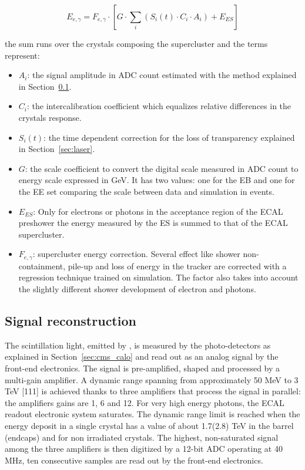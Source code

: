 \begin{equation}
  E_{e,\gamma} = F_{e,\gamma} \cdot \left[ G \cdot \sum_{i} ( S_i(t)\cdot C_i \cdot A_i ) + E_{ES} \right]
\end{equation}
\label{eq:sc_energy}

the sum runs over the crystals composing the supercluster and the terms represent:

\begin{itemize}
\item $A_i$: the signal amplitude in ADC count estimated with the method explained in Section~\ref{sec:signal_reco}.
\item $C_i$: the intercalibration coefficient which equalizes relative differences in the crystals response.
\item $S_i(t)$: the time dependent correction for the loss of transparency explained in Section~\ref{sec:laser}.
\item $G$: the scale coefficient to convert the digital scale measured in ADC count to energy scale expressed in GeV.
  It has two values:
  one for the EB and one for the EE set comparing the scale between data and simulation in \Zee events.
\item $E_{ES}$: Only for electrons or photons in the acceptance region of the ECAL preshower the energy measured
  by the ES is summed to that of the ECAL supercluster.
\item $F_{e,\gamma}$: supercluster energy correction. Several effect like shower non-containment, pile-up and
  loss of energy in the tracker are corrected with a regression technique trained on simulation. The factor also
  takes into account the slightly different shower development of electron and photons.
\end{itemize}

\subsection{Signal reconstruction}
\label{sec:signal_reco}
The scintillation light, emitted by \PbWO , is measured by the photo-detectors as explained in
Section~\ref{sec:cms_calo} and read
out as an analog signal by the front-end electronics. The signal is pre-amplified, shaped
and processed by a multi-gain amplifier. A dynamic range spanning from
approximately 50 MeV to 3 TeV [111] is achieved thanks to three
amplifiers that process the signal in parallel: the amplifiers gains are 1, 6 and 12.
For very high energy photons, the ECAL readout electronic system saturates.
The dynamic range limit is reached when the energy
deposit in a single crystal has a value of about 1.7(2.8) TeV in the barrel (endcaps) and for
non irradiated crystals. The highest, non-saturated signal among the three amplifiers is then digitized by a 12-bit
ADC operating at 40 MHz, ten consecutive samples are read out by the front-end electronics.


